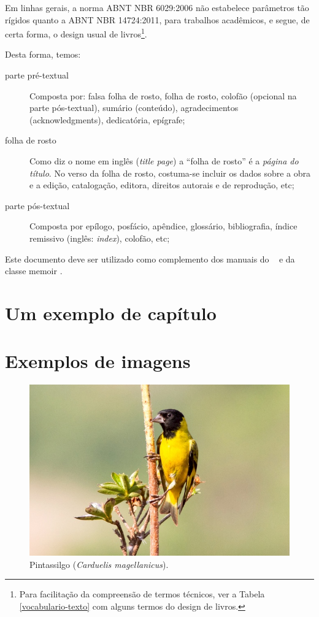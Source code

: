 \documentclass[
	10pt,				%
	openright,			%
	twoside,			%
	a5paper,			%
	english,			%
	french,				%
	spanish,			%
	brazil,				%
	sumario=tradicional
]{abntex2}
\begin{document}
Em linhas gerais, a norma ABNT NBR 6029:2006 não estabelece parâmetros tão
rígidos quanto a ABNT NBR 14724:2011, para trabalhos acadêmicos, e segue, de
certa forma, o design usual de livros\footnote{Para facilitação da compreensão
de termos técnicos, ver a Tabela \ref{vocabulario-texto} com alguns termos do
design de livros.}.

Desta forma, temos:

\begin{description}
\item[parte pré-textual] Composta por: falsa folha de rosto, folha de rosto,
colofão (opcional na parte pós-textual), sumário (conteúdo),
a\-gra\-de\-ci\-men\-tos (acknowledgments), dedicatória, epígrafe;
\item[folha de rosto] Como diz o nome em inglês (\textit{title page}) a ``folha
de rosto'' é a \textit{página do título}. No verso da folha de rosto, costuma-se
incluir os dados sobre a obra e a edição, catalogação, editora, direitos
autorais e de reprodução, etc;
\item [parte pós-textual] Composta por epílogo, posfácio, apêndice, glossário,
bibliografia, índice remissivo (inglês: \textit{index}), colofão, etc;

\end{description}

Este documento deve ser utilizado como complemento dos manuais do \abnTeX\ 
\cite{abntex2classe,abntex2cite,abntex2cite-alf} e da classe \textsf{memoir}
\cite{memoir}. 

  
\chapter{Um exemplo de capítulo}

\lipsum[1-10]

\chapter{Exemplos de imagens}

\lipsum[1]

\begin{figure}
\centering
\includegraphics[width=0.6\linewidth]{./imagens/abntex2-modelo-livro-pintassilgo}
\caption{Pintassilgo (\textit{Carduelis magellanicus}).}
\label{fig:pintassilgo}
\end{figure}
\end{document}
